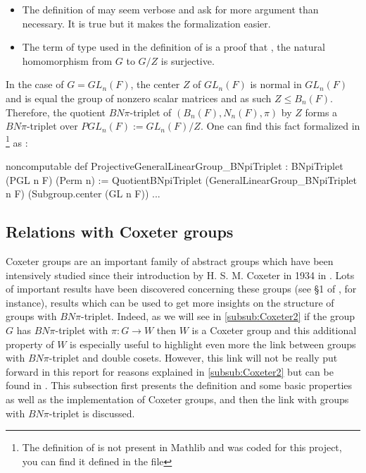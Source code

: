 \begin{commentary}
    \begin{itemize}
        \item
    The definition of  may seem verbose and ask for more argument than necessary. It is true but it makes the formalization easier. 

\item The term  of type   used in the definition of  is a proof that , the natural homomorphism from $G$ to $G / Z$ is surjective.
    \end{itemize}
\end{commentary}


\begin{ex}
    In the case of $G = GL_n(F)$, the center $Z$ of $GL_n(F)$ is normal in $GL_n(F)$ and is equal the group of nonzero scalar matrices and as such $Z \le B_n(F)$. Therefore, the quotient $BN\pi$-triplet of $\left( B_n(F),N_n(F), \pi \right)$ by $Z$ forms a $BN\pi$-triplet over $PGL_n\left( F \right) := GL_n(F)/Z$.
    One can find this fact formalized in \footnote{The definition of  is not present in Mathlib and was coded for this project, you can find it defined in the \href{https://github.com/corent1234/BNpairs/blob/master/finite_groups_of_Lie_type/FiniteGroupsOfLieType/GLn/GLn.lean}{} file} as :
\begin{leancode}
noncomputable
def ProjectiveGeneralLinearGroup_BNpiTriplet : BNpiTriplet (PGL n F) (Perm n) :=
  QuotientBNpiTriplet (GeneralLinearGroup_BNpiTriplet n F) (Subgroup.center (GL n F)) ...
   
\end{leancode}  
\end{ex}


\subsection{Relations with Coxeter groups}

    Coxeter groups are an important family of abstract groups which have been intensively studied since their introduction by H. S. M. Coxeter in 1934 in \cite{coxeter_discrete_1934}. 
   Lots of important results have been discovered concerning these groups (see §1 of \cite{bourbaki_groupes_2007}, for instance), results which can be used to get more insights on the structure of groups with $BN\pi$-triplet.
   Indeed, as we will see in \ref{subsub:Coxeter2} if the group $G$ has $BN\pi$-triplet with $\pi : G \to W$ then $W$ is a Coxeter group and this additional property of $W$ is especially useful to highlight even more the link between groups with $BN\pi$-triplet and double cosets. However, this link will not be really put forward in this report for reasons explained in \ref{subsub:Coxeter2} but can be found in \cite{bourbaki_groupes_2007}.
    This subsection first presents the definition and some basic properties as well as the \Lean implementation of Coxeter groups, and then the link with groups with $BN\pi$-triplet is discussed.

